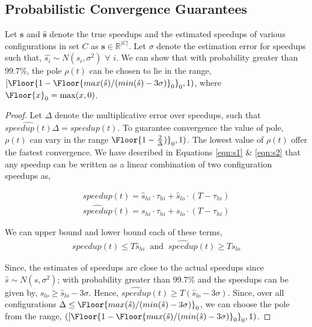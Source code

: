 \subsection*{Probabilistic Convergence Guarantees}


\begin{theorem}
  Let $\mathbf{s}$ and $\hat{\mathbf{s}}$ denote the true speedups and the estimated speedups of various configurations in set $C$ as $\mathbf{s} \in \mathbb{R}^{|C|}$. Let $\sigma$ denote the
  estimation error for speedups such that, $\hat{s_i} \sim
  N(s_i, \sigma^2)$ $\forall$ $i$. We can show that with probability
  greater than 99.7\%, the pole $\rho(t)$ can be chosen to lie in the range, $[\Floor{1- \Floor{max(\hat{s})/(min(\hat{s}) -  3\sigma)}_0}_0, 1)$, where $\Floor{x}_0 = \max(x,0)$.
\end{theorem}

\begin{proof}
Let $\Delta$ denote the multiplicative error over speedups, such that $ \widehat{speedup(t)}\Delta = speedup(t) $. To
guarantee convergence the value of pole, $\rho(t)$ can vary in the range
$\Floor{1-\frac{2}{\Delta})}_0, 1)$\cite{ICSE2014}. The lowest value of $\rho(t)$ offer the fastest convergence. We have described in Equations \ref{eqn:s1} \& \ref{eqn:s2} that any speedup can be written as a linear combination of two configuration speedups as,

\begin{align}
speedup(t) = \hat{s}_{hi} \cdot \tau_{hi} + \hat{s}_{lo} \cdot (T - \tau_{hi})
\end{align}
\begin{align}
\widehat{speedup}(t) = s_{hi} \cdot \tau_{hi} + s_{lo} \cdot (T - \tau_{hi})
\end{align}

We can upper bound and lower bound each of these terms,
\begin{align}
speedup(t) \leq T \hat{s}_{hi} \;\; \text{and} \;\; \widehat{speedup}(t) \geq T s_{lo}
\end{align}

Since, the estimates of speedups are close to the actual speedups since
$\hat{s} \sim N(s, \sigma^2)$; with probability greater
than 99.7\% and the speedups can be given by, $s_{lo} \geq
\hat{s}_{lo} - 3 \sigma$. Hence, $\widehat{speedup}(t) \geq T
(\hat{s}_{lo} -3 \sigma)$. Since, over all configurations $\Delta \leq
\Floor{max(\hat{s})/(min(\hat{s}) - 3\sigma)}_0$,  we can choose the pole from the range,  $([\Floor{1- \Floor{max(\hat{s})/(min(\hat{s}) - 3\sigma)}_0}_0, 1)$.


\end{proof}
